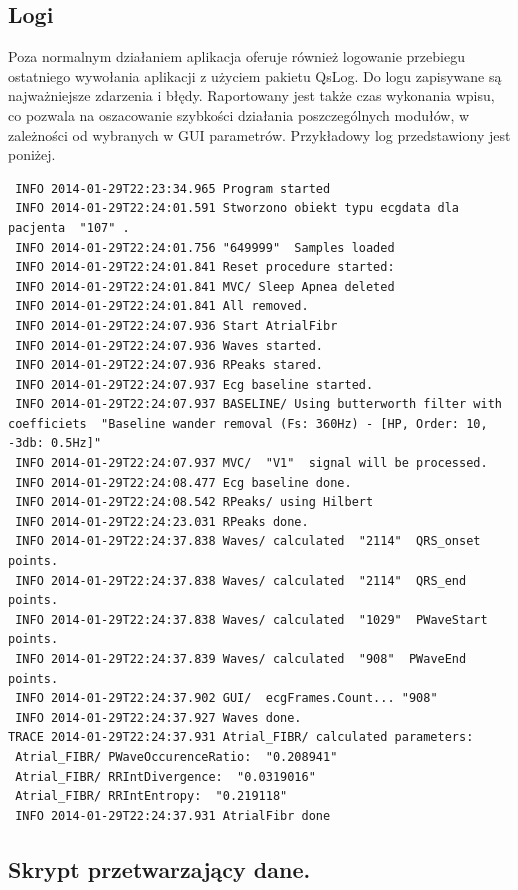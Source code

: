 \subsection{Logi}

Poza normalnym działaniem aplikacja oferuje również logowanie przebiegu ostatniego wywołania aplikacji z użyciem pakietu QsLog. Do logu zapisywane są najważniejsze zdarzenia i błędy. Raportowany jest także czas wykonania wpisu, co pozwala na oszacowanie szybkości działania poszczególnych modułów, w zależności od wybranych w GUI parametrów. Przykładowy log przedstawiony jest poniżej.

\begin{minipage}{\textwidth}
\begin{verbatim}
 INFO 2014-01-29T22:23:34.965 Program started 
 INFO 2014-01-29T22:24:01.591 Stworzono obiekt typu ecgdata dla pacjenta  "107" . 
 INFO 2014-01-29T22:24:01.756 "649999"  Samples loaded 
 INFO 2014-01-29T22:24:01.841 Reset procedure started: 
 INFO 2014-01-29T22:24:01.841 MVC/ Sleep Apnea deleted 
 INFO 2014-01-29T22:24:01.841 All removed. 
 INFO 2014-01-29T22:24:07.936 Start AtrialFibr 
 INFO 2014-01-29T22:24:07.936 Waves started. 
 INFO 2014-01-29T22:24:07.936 RPeaks stared. 
 INFO 2014-01-29T22:24:07.937 Ecg baseline started. 
 INFO 2014-01-29T22:24:07.937 BASELINE/ Using butterworth filter with coefficiets  "Baseline wander removal (Fs: 360Hz) - [HP, Order: 10, -3db: 0.5Hz]" 
 INFO 2014-01-29T22:24:07.937 MVC/  "V1"  signal will be processed. 
 INFO 2014-01-29T22:24:08.477 Ecg baseline done. 
 INFO 2014-01-29T22:24:08.542 RPeaks/ using Hilbert 
 INFO 2014-01-29T22:24:23.031 RPeaks done. 
 INFO 2014-01-29T22:24:37.838 Waves/ calculated  "2114"  QRS_onset points. 
 INFO 2014-01-29T22:24:37.838 Waves/ calculated  "2114"  QRS_end points. 
 INFO 2014-01-29T22:24:37.838 Waves/ calculated  "1029"  PWaveStart points. 
 INFO 2014-01-29T22:24:37.839 Waves/ calculated  "908"  PWaveEnd points. 
 INFO 2014-01-29T22:24:37.902 GUI/  ecgFrames.Count... "908" 
 INFO 2014-01-29T22:24:37.927 Waves done. 
TRACE 2014-01-29T22:24:37.931 Atrial_FIBR/ calculated parameters: 
 Atrial_FIBR/ PWaveOccurenceRatio:  "0.208941" 
 Atrial_FIBR/ RRIntDivergence:  "0.0319016" 
 Atrial_FIBR/ RRIntEntropy:  "0.219118" 
 INFO 2014-01-29T22:24:37.931 AtrialFibr done 
\end{verbatim}
\end{minipage}

\subsection{Skrypt przetwarzający dane.}
\label{sec:skrypt}


